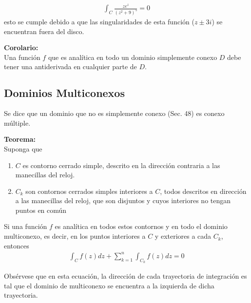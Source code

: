 \begin{gather*}
    \int_C \frac{ze^z}{(z^2 + 9)^5} = 0
\end{gather*}
esto se cumple debido a que las singularidades de esta función ($z \pm 3i$) se encuentran fuera del disco.
\begin{mdframed}
    \textbf{Corolario:}\\
    Una función $f$ que es analítica en todo un dominio simplemente conexo $D$ debe tener una antiderivada en cualquier parte de $D$. 
\end{mdframed}

\subsection{Dominios Multiconexos}
Se dice que un dominio que no es simplemente conexo (Sec. 48) es conexo múltiple.
\begin{mdframed}
    \textbf{Teorema:}\\
    Suponga que
    \begin{enumerate}
        \item  $C$ es contorno cerrado simple, descrito en la dirección contraria a las manecillas del reloj.
        \item $C_k$ son contornos cerrados simples interiores a $C$, todos descritos en dirección a las manecillas del reloj, que son disjuntos y cuyos interiores no tengan puntos en común
    \end{enumerate}
    Si una función $f$ es analítica en todos estos contornos y en todo el dominio multiconexo, es decir, en los puntos interiores a $C$ y exteriores a cada $C_k$, entonces
    \begin{gather*}
        \int_{C} f(z)dz + \sum_{k=1}^{n}\int_{C_k}f(z)dz = 0
    \end{gather*}
\end{mdframed}
Obsérvese que en esta ecuación, la dirección de cada trayectoria de integración es tal que el dominio de multiconexo se encuentra a la izquierda de dicha trayectoria.

